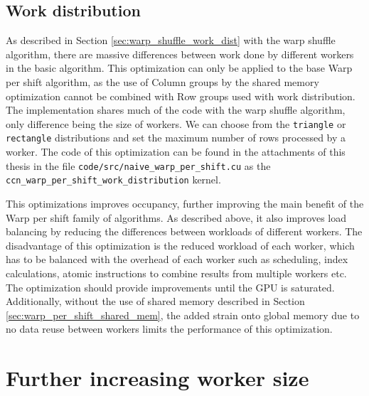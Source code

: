 \subsection{Work distribution}
\label{sec:warp_per_shift_work_dist}

As described in Section \ref{sec:warp_shuffle_work_dist} with the warp shuffle algorithm, there are massive differences between work done by different workers in the basic algorithm. This optimization can only be applied to the base Warp per shift algorithm, as the use of Column groups by the shared memory optimization cannot be combined with Row groups used with work distribution. The implementation shares much of the code with the warp shuffle algorithm, only difference being the size of workers. We can choose from the \texttt{triangle} or \texttt{rectangle} distributions and set the maximum number of rows processed by a worker. The code of this optimization can be found in the attachments of this thesis in the file \texttt{code/src/naive\_warp\_per\_shift.cu} as the \texttt{ccn\_warp\_per\_shift\_work\_distribution} kernel.


This optimizations improves occupancy, further improving the main benefit of the Warp per shift family of algorithms. As described above, it also improves load balancing by reducing the differences between workloads of different workers. The disadvantage of this optimization is the reduced workload of each worker, which has to be balanced with the overhead of each worker such as scheduling, index calculations, atomic instructions to combine results from multiple workers etc. The optimization should provide improvements until the GPU is saturated. Additionally, without the use of shared memory described in Section \ref{sec:warp_per_shift_shared_mem}, the added strain onto global memory due to no data reuse between workers limits the performance of this optimization. 


\section{Further increasing worker size}
\label{sec:block_per_shift}



